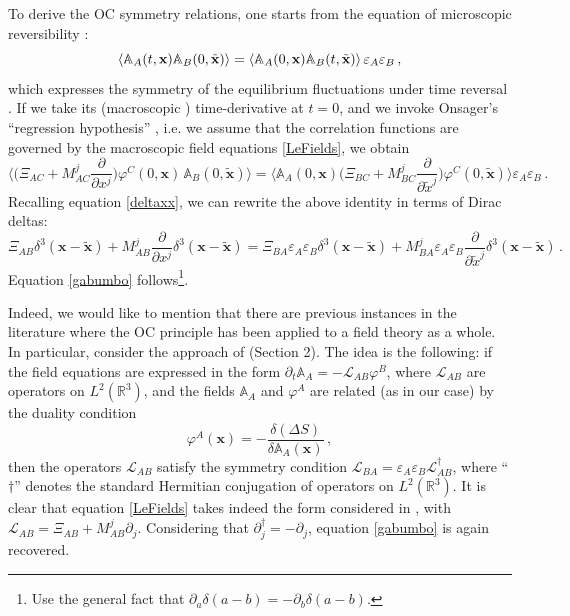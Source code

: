 \documentclass[a4paper, amsfonts, amssymb, amsmath, reprint, showkeys, nofootinbib, twoside, onecolumn,notitlepage]{revtex4-1}
\begin{document}
To derive the OC symmetry relations, one starts from the equation of microscopic reversibility \cite{Geigenmuller1983,Carbone2020}:
\begin{equation}
\braket{\mathbb{A}_A(t,\textbf{x}) \mathbb{A}_B(0,\tilde{\textbf{x}})} = \braket{\mathbb{A}_A(0,\textbf{x}) \mathbb{A}_B(t,\tilde{\textbf{x}})} \varepsilon_A \varepsilon_B \, ,
\end{equation}
which expresses the symmetry of the equilibrium fluctuations under time reversal \cite{landau5}. If we take its (macroscopic \cite{Onsager_Casimir}) time-derivative at $t=0$, and we invoke Onsager's ``regression hypothesis'' \cite{Geigenmuller1983}, i.e. we assume that the correlation functions are governed by the macroscopic field equations \eqref{LeFields}, we obtain
\begin{equation}
\bigg\langle \bigg(\Xi_{AC}  +M^j_{AC} \dfrac{\partial}{\partial x^j} \bigg) \varphi^C(0,\textbf{x}) \, \mathbb{A}_B(0,\tilde{\textbf{x}}) \bigg\rangle = \bigg\langle\mathbb{A}_A(0,\textbf{x}) \bigg(\Xi_{BC} +M^j_{BC} \dfrac{\partial}{\partial \tilde{x}^j} \bigg) \varphi^C(0,\tilde{\textbf{x}})\bigg\rangle \varepsilon_A \varepsilon_B \, .
\end{equation}
Recalling equation \eqref{deltaxx}, we can rewrite the above identity in terms of Dirac deltas:
\begin{equation}
\Xi_{AB} \delta^3(\textbf{x}-\tilde{\textbf{x}}) + M^j_{AB} \dfrac{\partial}{\partial x^j} \delta^3(\textbf{x}-\tilde{\textbf{x}}) = \Xi_{BA} \varepsilon_A \varepsilon_B \delta^3(\textbf{x}-\tilde{\textbf{x}}) + M^j_{BA} \varepsilon_A \varepsilon_B   \dfrac{\partial}{\partial \tilde{x}^j}\delta^3(\textbf{x}-\tilde{\textbf{x}}) \, .
\end{equation}
Equation \eqref{gabumbo} follows\footnote{Use the general fact that $\partial_a \delta(a-b)=-\partial_b \delta(a-b)$.}.

Indeed, we would like to mention that there are previous instances in the literature where the OC principle has been applied to a field theory as a whole. In particular, consider the approach of \citet{Hubmer1988} (Section 2). The idea is the following: if the field equations are expressed in the form $\partial_t \mathbb{A}_A =-\mathcal{L}_{AB}\varphi^B$, where $\mathcal{L}_{AB}$ are operators on $L^2(\mathbb{R}^3)$, and the fields $\mathbb{A}_A$ and $\varphi^A$ are related (as in our case) by the duality condition
\begin{equation}
\varphi^A(\textbf{x}) = -\dfrac{\delta (\Delta S)}{\delta \mathbb{A}_A(\textbf{x})} \, ,
\end{equation}
then the operators $\mathcal{L}_{AB}$ satisfy the symmetry condition $\mathcal{L}_{BA}=\varepsilon_A \varepsilon_B \mathcal{L}_{AB}^\dagger$, where ``$\dagger$'' denotes the standard Hermitian conjugation of operators on $L^2(\mathbb{R}^3)$. It is clear that equation \eqref{LeFields} takes indeed the form considered in \cite{Hubmer1988}, with $\mathcal{L}_{AB}=\Xi_{AB}+M^j_{AB}\partial_j$. Considering that $\partial_j^\dagger=-\partial_j$, equation \eqref{gabumbo} is again recovered.
\end{document}
